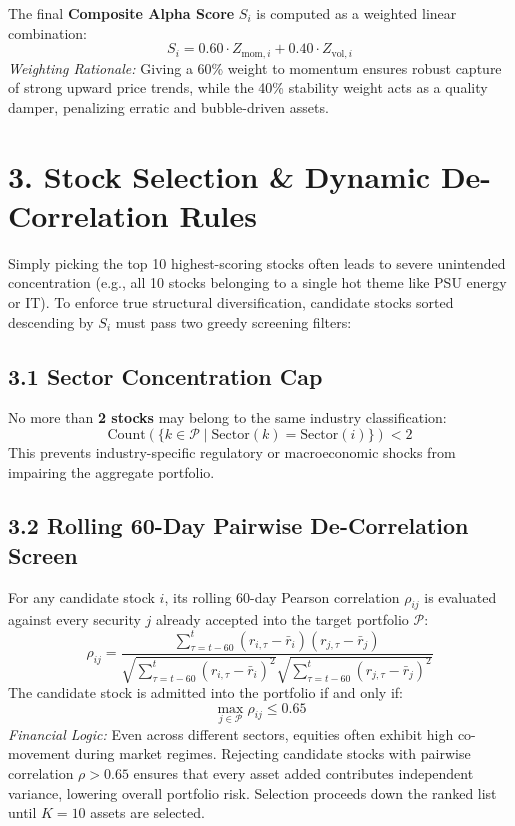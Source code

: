 \documentclass[11pt,a4paper]{article}
\begin{document}
The final \textbf{Composite Alpha Score} $S_i$ is computed as a weighted linear combination:
\begin{equation}
    S_i = 0.60 \cdot Z_{\text{mom}, i} + 0.40 \cdot Z_{\text{vol}, i}
\end{equation}
\textit{Weighting Rationale:} Giving a 60\% weight to momentum ensures robust capture of strong upward price trends, while the 40\% stability weight acts as a quality damper, penalizing erratic and bubble-driven assets.

\section{3. Stock Selection \& Dynamic De-Correlation Rules}
Simply picking the top 10 highest-scoring stocks often leads to severe unintended concentration (e.g., all 10 stocks belonging to a single hot theme like PSU energy or IT). To enforce true structural diversification, candidate stocks sorted descending by $S_i$ must pass two greedy screening filters:

\subsection{3.1 Sector Concentration Cap}
No more than \textbf{2 stocks} may belong to the same industry classification:
\begin{equation}
    \text{Count}\left(\{k \in \mathcal{P} \mid \text{Sector}(k) = \text{Sector}(i)\}\right) < 2
\end{equation}
This prevents industry-specific regulatory or macroeconomic shocks from impairing the aggregate portfolio.

\subsection{3.2 Rolling 60-Day Pairwise De-Correlation Screen}
For any candidate stock $i$, its rolling 60-day Pearson correlation $\rho_{ij}$ is evaluated against every security $j$ already accepted into the target portfolio $\mathcal{P}$:
\begin{equation}
    \rho_{ij} = \frac{\sum_{\tau=t-60}^{t} (r_{i,\tau} - \bar{r}_i)(r_{j,\tau} - \bar{r}_j)}{\sqrt{\sum_{\tau=t-60}^{t}(r_{i,\tau}-\bar{r}_i)^2} \sqrt{\sum_{\tau=t-60}^{t}(r_{j,\tau}-\bar{r}_j)^2}}
\end{equation}
The candidate stock is admitted into the portfolio if and only if:
\begin{equation}
    \max_{j \in \mathcal{P}} \rho_{ij} \le 0.65
\end{equation}
\textit{Financial Logic:} Even across different sectors, equities often exhibit high co-movement during market regimes. Rejecting candidate stocks with pairwise correlation $\rho > 0.65$ ensures that every asset added contributes independent variance, lowering overall portfolio risk. Selection proceeds down the ranked list until $K = 10$ assets are selected.
\end{document}

